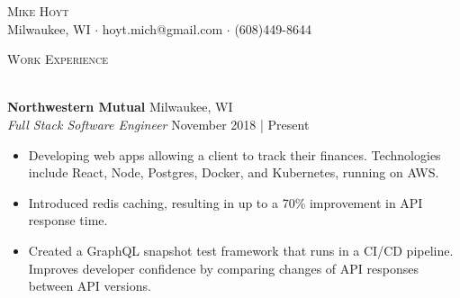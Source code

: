\documentclass[a4paper]{article}
\newcommand{\lineunder} {
    \vspace*{-8pt} \\
    \hspace*{-18pt} \hrulefill \\
}
\newcommand{\header} [1] {
    {\hspace*{-18pt}\vspace*{6pt} \textsc{#1}}
    \vspace*{-6pt} \lineunder
}
\begin{document}
\vspace*{-40pt}



\vspace*{-10pt}
\begin{center}
	{\Huge \scshape {Mike Hoyt}}\\
	Milwaukee, WI $\cdot$ hoyt.mich@gmail.com $\cdot$ (608)449-8644\\
\end{center}


\header{Work Experience}
\vspace{1mm}

\textbf{Northwestern Mutual} \hfill Milwaukee, WI\\
\textit{Full Stack Software Engineer} \hfill November 2018 | Present\\
\vspace{-1mm}
\begin{itemize} \itemsep 1pt
	\item Developing web apps allowing a client to track their finances. Technologies include React, Node, Postgres, Docker, and Kubernetes, running on AWS.
	\item Introduced redis caching, resulting in up to a 70\% improvement in API response time.
	\item Created a GraphQL snapshot test framework that runs in a CI/CD pipeline. Improves developer confidence by comparing changes of API responses between API versions.
\end{itemize}
\vspace{-1mm}
\end{document}
